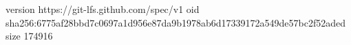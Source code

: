 version https://git-lfs.github.com/spec/v1
oid sha256:6775af28bbd7c0697a1d956e87da9b1978ab6d17339172a549de57bc2f52aded
size 174916
